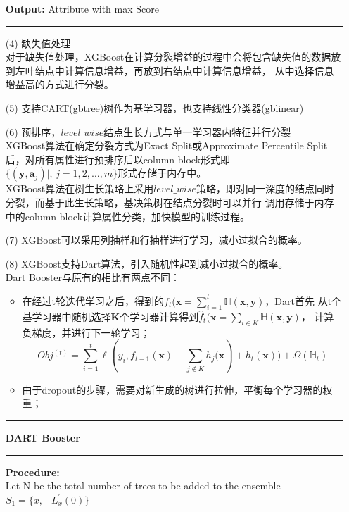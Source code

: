 \documentclass[a4paper]{article}
\begin{document}
\begin{itemize}
				\textbf{Output:} Attribute with max Score\\
			\noindent\rule[0.10\baselineskip]{\textwidth}{0.75pt}
			\item[(4)] 缺失值处理\\
			对于缺失值处理，XGBoost在计算分裂增益的过程中会将包含缺失值的数据放到左叶结点中计算信息增益，再放到右结点中计算信息增益，
			从中选择信息增益高的方式进行分裂。
			\item[(5)] 支持CART(gbtree)树作为基学习器，也支持线性分类器(gblinear)
			\item[(6)] 预排序，$level\_wise$结点生长方式与单一学习器内特征并行分裂\\
			XGBoost算法在确定分裂方式为Exact Split或Approximate Percentile Split后，对所有属性进行预排序后以column block形式即
			$\{(\textbf{y},\textbf{a}_j)|,\,j=1,2,\dots,m\}$形式存储于内存中。\\
			XGBoost算法在树生长策略上采用$level\_wise$策略，即对同一深度的结点同时分裂，而基于此生长策略，基决策树在结点分裂时可以并行
			调用存储于内存中的column block计算属性分类，加快模型的训练过程。
			\item[(7)] XGBoost可以采用列抽样和行抽样进行学习，减小过拟合的概率。
			\item[(8)] XGBoost支持Dart算法，引入随机性起到减小过拟合的概率。\\
			Dart Booster与原有的相比有两点不同：
			\begin{itemize}
				\item 在经过t轮迭代学习之后，得到的$f_t(\textbf{x}=\sum_{i=1}^{t}\mathbb{H}(\textbf{x},\textbf{y})$，Dart首先
					从t个基学习器中随机选择$\textbf{K}$个学习器计算得到$\hat{f}_t(\textbf{x}=\sum_{i\in K}\mathbb{H}(\textbf{x},\textbf{y})$，
					计算负梯度，并进行下一轮学习；
					$$Obj^{(t)} = \sum_{i=1}^{t}\ell\left(y_i,f_{t-1}(\textbf{x})-\sum_{j\notin K}h_j(\textbf{x}\right)+h_t(\textbf{x}))+\Omega(\mathbb{H}_t)$$
				\item 由于dropout的步骤，需要对新生成的树进行拉伸，平衡每个学习器的权重；
			\end{itemize} 
			\noindent\rule[0.10\baselineskip]{\textwidth}{0.75pt}\par
			\textbf{DART Booster}\\
			\noindent\rule[0.10\baselineskip]{\textwidth}{0.5pt}
					\textbf{Procedure:}\\
					\hspace*{32pt}	Let N be the total number of trees to be added to the ensemble\\
					\hspace*{32pt}	$S_1 = \{x, -L_x^{'}(0)\}$\\

\end{itemize}
\end{document}
